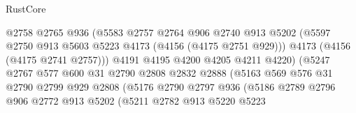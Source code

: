 \begin{lexlean}{RustCore}
\begin{coremodule}
                                    @2758
                                    @2765
                                    @936
                                    (@5583
                                      @2757
                                      @2764
                                      @906
                                      @2740
                                      @913
                                      @5202
                                      (@5597
                                        @2750
                                        @913
                                        @5603
                                        @5223
                                        @4173
                                        (@4156 (@4175 @2751 @929)))
                                      @4173
                                      (@4156 (@4175 @2741 @2757)))
                                    @4191
                                    @4195
                                    @4200
                                    @4205
                                    @4211
                                    @4220)
                                  (@5247
                                    @2767
                                    @577
                                    @600
                                    @31
                                    @2790
                                    @2808
                                    @2832
                                    @2888
                                    (@5163
                                      @569
                                      @576
                                      @31
                                      @2790
                                      @2799
                                      @929
                                      @2808
                                      (@5176
                                        @2790
                                        @2797
                                        @936
                                        (@5186
                                          @2789
                                          @2796
                                          @906
                                          @2772
                                          @913
                                          @5202
                                          (@5211
                                            @2782
                                            @913
                                            @5220
                                            @5223

\end{coremodule}
\end{lexlean}
